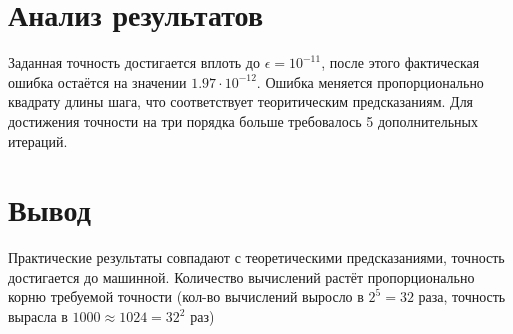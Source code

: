 \documentclass[a4paper]{article}
\begin{document}
\section{Анализ результатов}\label{sec:S8}
Заданная точность достигается вплоть до \(\epsilon = 10^{-11}\), после этого фактическая ошибка остаётся на значении \(1.97\cdot10^{-12}\).
Ошибка меняется пропорционально квадрату длины шага, что соответствует теоритическим предсказаниям.
Для достижения точности на три порядка больше требовалось 5 дополнительных итераций.
\section{Вывод}\label{sec:S9}

Практические результаты совпадают с теоретическими предсказаниями, точность достигается до машинной. Количество вычислений растёт пропорционально корню требуемой точности
(кол-во вычислений выросло в \(2^{5} = 32\) раза, точность вырасла в \(1000 \approx 1024 = 32^{2}\) раз)
\end{document}
